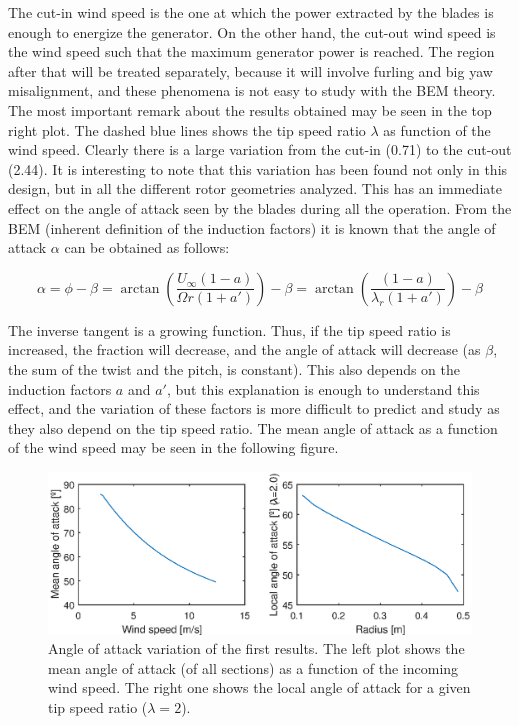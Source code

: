 \documentclass[../TFG_Report.tex]{subfiles}
\begin{document}
The cut-in wind speed is the one at which the power extracted by the blades is enough to energize the generator. On the other hand, the cut-out wind speed is the wind speed such that the maximum generator power is reached. The region after that will be treated separately, because it will involve furling and big yaw misalignment, and these phenomena is not easy to study with the BEM theory. \\

The most important remark about the results obtained may be seen in the top right plot. The dashed blue lines shows the tip speed ratio $\lambda$ as function of the wind speed. Clearly there is a large variation from the cut-in (0.71) to the cut-out (2.44). It is interesting to note that this variation has been found not only in this design, but in all the different rotor geometries analyzed. This has an immediate effect on the angle of attack seen by the blades during all the operation. From the BEM (inherent definition of the induction factors) it is known that the angle of attack $\alpha$ can be obtained as follows: 

\begin{equation}
\alpha = \phi - \beta = \arctan\left(\dfrac{U_{\infty} (1-a)}{\Omega r (1+a')}   \right) - \beta = \arctan\left(\dfrac{(1-a)}{\lambda_r (1+a')}   \right) - \beta 
\end{equation}

The inverse tangent is a growing  function. Thus, if the tip speed ratio is increased, the fraction will decrease, and the angle of attack will decrease (as $\beta$, the sum of the twist and the pitch, is constant). This also depends on the induction factors $a$ and $a'$, but this explanation is enough to understand this effect, and the variation of these factors is more difficult to predict and study as they also depend on the tip speed ratio. The mean angle of attack as a function of the wind speed may be seen in the following figure.  

\begin{figure}[h!]
	\centering
	\includegraphics[width=1\linewidth]{Images/Aerodynamic_Design/First_AngleOfAttack_Analysis}
	\caption[Angle of attack variation of the first results]{Angle of attack variation of the first results. The left plot shows the mean angle of attack (of all sections) as a function of the incoming wind speed. The right one shows the local angle of attack for a given tip speed ratio ($\lambda=2$).  }
	\label{fig:AngleOfAttackAnalysisFirst}
\end{figure} 
\FloatBarrier
\end{document}
